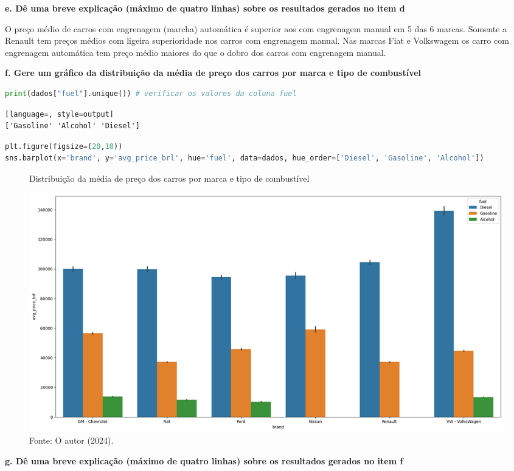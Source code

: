 \begin{adjustwidth}{1em}{}
\textbf{e. Dê uma breve explicação (máximo de quatro linhas) sobre os resultados gerados no item d}
\end{adjustwidth}

O preço médio de carros com engrenagem (marcha) automática é superior aos com engrenagem manual em 5 das 6 marcas. Somente a Renault tem preços médios com ligeira superioridade nos carros com engrenagem manual. Nas marcas Fiat e Volkswagem os carro com engrenagem automática tem preço médio maiores do que o dobro dos carros com engrenagem manual.

\begin{adjustwidth}{1em}{}
\textbf{f. Gere um gráfico da distribuição da média de preço dos carros por marca e tipo de combustível}
\end{adjustwidth}
\begin{lstlisting}[language=Python, style=input]
print(dados["fuel"].unique()) # verificar os valores da coluna fuel
\end{lstlisting}
\begin{lstlisting}[language=, style=output]
['Gasoline' 'Alcohol' 'Diesel']
\end{lstlisting}
\begin{lstlisting}[language=Python, style=input]
plt.figure(figsize=(20,10))
sns.barplot(x='brand', y='avg_price_brl', hue='fuel', data=dados, hue_order=['Diesel', 'Gasoline', 'Alcohol'])
\end{lstlisting}
\begin{figure}[H]
\centering
\caption{Distribuição da média de preço dos carros por marca e tipo de combustível}
\includegraphics[width=1\linewidth]{apendices/fig/2_IAA002_5.png}
\caption*{Fonte: O autor (2024).}
\end{figure}

\begin{adjustwidth}{1em}{}
\textbf{g. Dê uma breve explicação (máximo de quatro linhas) sobre os resultados gerados no item f}
\end{adjustwidth}

